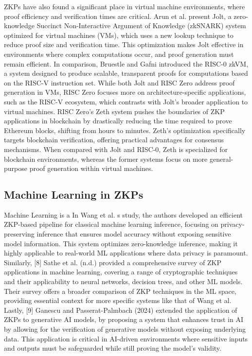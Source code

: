 \documentclass{scrartcl}
\begin{document}
ZKPs have also found a significant place in virtual machine environments, where proof efficiency and verification times are critical. Arun et al.\cite{arun2024jolt} present Jolt, a zero-knowledge Succinct Non-Interactive Argument of Knowledge (zkSNARK) system optimized for virtual machines (VMs), which uses a new lookup technique to reduce proof size and verification time. This optimization makes Jolt effective in environments where complex computations occur, and proof generation must remain efficient. In comparison, Bruestle and Gafni\cite{bruestle2023risc} introduced the RISC-0 zkVM, a system designed to produce scalable, transparent proofs for computations based on the RISC-V instruction set. While both Jolt and RISC Zero address proof generation in VMs, RISC Zero focuses more on architecture-specific applications, such as the RISC-V ecosystem, which contrasts with Jolt’s broader application to virtual machines. RISC Zero’s Zeth system\cite{risc2023zeth} pushes the boundaries of ZKP applications in blockchain by drastically reducing the time required to prove Ethereum blocks, shifting from hours to minutes. Zeth’s optimization specifically targets blockchain verification, offering practical advantages for consensus mechanisms. When compared with Jolt and RISC-0, Zeth is specialized for blockchain environments, whereas the former systems focus on more general-purpose proof generation within virtual machines.

\subsection{Machine Learning in ZKPs}

Machine Learning is a In Wang et al. s study, the authors developed an efficient ZKP-based pipeline for classical machine learning inference, focusing on privacy-preserving inference that ensures model accuracy without exposing sensitive model information. This system optimizes zero-knowledge inference, making it highly applicable to real-world ML applications where data privacy is paramount. Similarly, [8] Sathe et al. (n.d.) provided a comprehensive survey of ZKP applications in machine learning, covering a range of cryptographic techniques and their applicability to neural networks, decision trees, and other ML models. Their survey offers a broader comparison of ZKP techniques in the ML space, providing essential context for more specific systems like that of Wang et al.
Lastly, [9] Ganescu and Passerat-Palmbach (2024) extended the application of ZKPs to generative AI models, by proposing a system that enhances trust in AI by allowing for the verification of generative models without exposing underlying data. This application is critical in AI-driven environments where sensitive inputs and outputs must be safeguarded while still proving the model’s validity.
\end{document}
